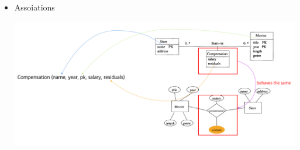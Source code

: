 \documentclass[12pt]{article}
\begin{document}
\begin{enumerate}[1.]
\begin{itemize}
        \item Assoiations

        \begin{center}
        \includegraphics[width=\linewidth]{images/worksheet_15_solution_8.png}
        \end{center}

    \end{itemize}

\end{enumerate}
\end{document}
